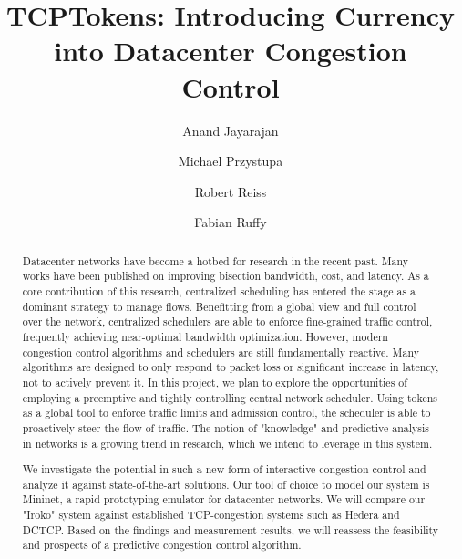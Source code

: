 \documentclass[sigconf]{acmart}
\begin{document}
\title{TCPTokens: Introducing Currency into Datacenter Congestion Control}

\author{Anand Jayarajan}

\author{Michael Przystupa}

\author{Robert Reiss}

\author{Fabian Ruffy}

\begin{abstract}
Datacenter networks have become a hotbed for research in the recent past. Many works have been published on improving bisection bandwidth, cost, and latency. As a core contribution of this research, centralized scheduling has entered the stage as a dominant strategy to manage flows. Benefitting from a global view and full control over the network, centralized schedulers are able to enforce fine-grained traffic control, frequently achieving near-optimal bandwidth optimization. However, modern congestion control algorithms and schedulers are still fundamentally reactive. Many algorithms are designed to only respond to packet loss or significant increase in latency, not to actively prevent it.
In this project, we plan to explore the opportunities of employing a preemptive and tightly controlling central network scheduler. Using tokens as a global tool to enforce traffic limits and admission control, the scheduler is able to proactively steer the flow of traffic. The notion of "knowledge" and predictive analysis in networks is a growing trend in research, which we intend to leverage in this system.

We investigate the potential in such a new form of interactive congestion control and analyze it against state-of-the-art solutions. Our tool of choice to model our system is Mininet, a rapid prototyping emulator for datacenter networks. We will compare our "Iroko" system against established TCP-congestion systems such as Hedera and DCTCP. Based on the findings and measurement results, we will reassess the feasibility and prospects of a predictive congestion control algorithm.
\end{abstract}



\end{document}
